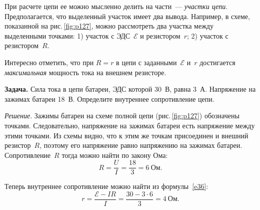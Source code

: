 \documentclass[main.tex]{subfiles}
\begin{document}
При расчете цепи ее можно мысленно делить на части~--- \emph{участки цепи}. Предполагается, что выделенный участок имеет два вывода. Например, в схеме, показанной на рис.\,\ref{fig:p127}, можно рассмотреть два участка между выделенными точками: 1) участок с ЭДС~$\mathscr E$ и резистором~$r$; 2) участок с резистором~$R$. 



Интересно отметить, что при $R=r$ в цепи с заданными~$\mathscr E$ и~$r$ достигается \emph{максимальная} мощность тока на внешнем резисторе.

\medskip

\noindent\textbf{Задача.} Сила тока в цепи батареи, ЭДС которой 30~В, равна 3~А. Напряжение на зажимах батареи 18~В. Определите внутреннее сопротивление цепи.

\smallskip

\noindent\emph{Решение}. Зажимы батареи на схеме полной цепи (рис.\,\ref{fig:p127}) обозначены точками. Следовательно, напряжение на зажимах батареи есть напряжение между этими точками. Из схемы видно, что к этим же точкам присоединен и внешний резистор~$R$, поэтому его напряжение равно напряжению на зажимах батареи. Сопротивление~$R$ тогда можно найти по закону Ома: 
\begin{equation*}
    R=\frac{U}{I}=\frac{18}{3}=6~\text{Ом.}
\end{equation*}

Теперь внутреннее сопротивление можно найти из формулы~\eqref{e36}:
\begin{equation*}
    r=\frac{\mathscr E-IR}{I}=\frac{30-3\cdot6}{3}=4~\text{Ом}.
\end{equation*}









 
\end{document}
